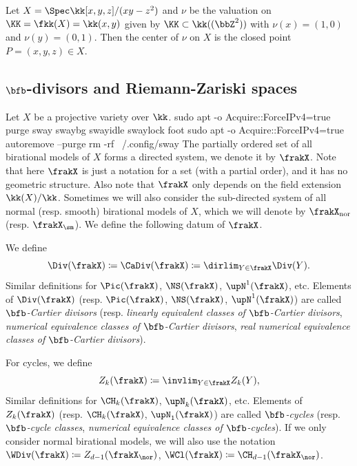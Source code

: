 \begin{example}
	Let $X = \Spec \kk[x,y,z]/(xy-z^2)$ and $\nu$ be the valuation on $\KK = \fkk(X) = \kk(x,y)$ given by $\KK \subset \kk((\bbZ^2))$ with $\nu(x) = (1,0)$ and $\nu(y) = (0,1)$.
	Then the center of $\nu$ on $X$ is the closed point $P = (x,y,z) \in X$.
	\Yang{}
\end{example}

\subsection[b-divisors and Riemann-Zariski spaces]{$\bfb$-divisors and Riemann-Zariski spaces}

Let $X$ be a projective variety over $\kk$.
sudo apt -o Acquire::ForceIPv4=true purge sway swaybg swayidle swaylock foot
sudo apt -o Acquire::ForceIPv4=true autoremove --purge
rm -rf ~/.config/sway
The partially ordered set of all birational models of $X$ forms a directed system, we denote it by $\frakX$.
Note that here $\frakX$ is just a notation for a set (with a partial order), and it has no geometric structure.
Also note that $\frakX$ only depends on the field extension $\kk(X)/\kk$.
Sometimes we will also consider the sub-directed system of all normal (resp. smooth) birational models of $X$, which we will denote by $\frakX_{\mathrm{nor}}$ (resp. $\frakX_{\sm}$).
We define the following datum of $\frakX$.

\begin{definition}
	We define
	\[ \Div(\frakX) \coloneqq \CaDiv(\frakX) \coloneqq \dirlim_{Y \in \frakX} \Div(Y). \]
	Similar definitions for $\Pic(\frakX)$, $\NS(\frakX)$, $\upN^1(\frakX)$, etc.
	Elements of $\Div(\frakX)$ (resp. $\Pic(\frakX)$, $\NS(\frakX)$, $\upN^1(\frakX)$) are called \emph{$\bfb$-Cartier divisors} (resp. \emph{linearly equivalent classes of $\bfb$-Cartier divisors}, \emph{numerical equivalence classes of $\bfb$-Cartier divisors}, \emph{real numerical equivalence classes of $\bfb$-Cartier divisors}).

	For cycles, we define
	\[ Z_{k}(\frakX) \coloneqq \invlim_{Y \in \frakX} Z_{k}(Y), \]
	Similar definitions for $\CH_{k}(\frakX)$, $\upN_k(\frakX)$, etc.
	Elements of $Z_{k}(\frakX)$ (resp. $\CH_{k}(\frakX)$, $\upN_1(\frakX)$) are called \emph{$\bfb$-cycles} (resp. \emph{$\bfb$-cycle classes}, \emph{numerical equivalence classes of $\bfb$-cycles}).
	If we only consider normal birational models, we will also use the notation $\WDiv(\frakX) \coloneqq Z_{d-1}(\frakX_\nor)$, $\WCl(\frakX) \coloneqq \CH_{d-1}(\frakX_\nor)$.
\end{definition}

